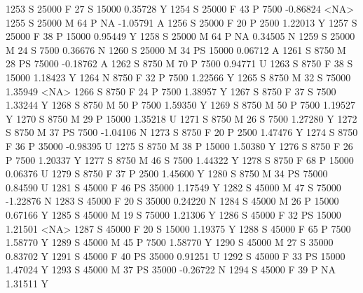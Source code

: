 \documentclass{article}
\begin{document}
\begin{Schunk}
\begin{Soutput}
1253      S      25000   F  27         S  15000   0.35728    Y
1254      S      25000   F  43         P   7500  -0.86824 <NA>
1255      S      25000   M  64         P     NA  -1.05791    A
1256      S      25000   F  20         P   2500   1.22013    Y
1257      S      25000   F  38         P  15000   0.95449    Y
1258      S      25000   M  64         P     NA   0.34505    N
1259      S      25000   M  24         S   7500   0.36676    N
1260      S      25000   M  34        PS  15000   0.06712    A
1261      S       8750   M  28        PS  75000  -0.18762    A
1262      S       8750   M  70         P   7500   0.94771    U
1263      S       8750   F  38         S  15000   1.18423    Y
1264      N       8750   F  32         P   7500   1.22566    Y
1265      S       8750   M  32         S  75000   1.35949 <NA>
1266      S       8750   F  24         P   7500   1.38957    Y
1267      S       8750   F  37         S   7500   1.33244    Y
1268      S       8750   M  50         P   7500   1.59350    Y
1269      S       8750   M  50         P   7500   1.19527    Y
1270      S       8750   M  29         P  15000   1.35218    U
1271      S       8750   M  26         S   7500   1.27280    Y
1272      S       8750   M  37        PS   7500  -1.04106    N
1273      S       8750   F  20         P   2500   1.47476    Y
1274      S       8750   F  36         P  35000  -0.98395    U
1275      S       8750   M  38         P  15000   1.50380    Y
1276      S       8750   F  26         P   7500   1.20337    Y
1277      S       8750   M  46         S   7500   1.44322    Y
1278      S       8750   F  68         P  15000   0.06376    U
1279      S       8750   F  37         P   2500   1.45600    Y
1280      S       8750   M  34        PS  75000   0.84590    U
1281      S      45000   F  46        PS  35000   1.17549    Y
1282      S      45000   M  47         S  75000  -1.22876    N
1283      S      45000   F  20         S  35000   0.24220    N
1284      S      45000   M  26         P  15000   0.67166    Y
1285      S      45000   M  19         S  75000   1.21306    Y
1286      S      45000   F  32        PS  15000   1.21501 <NA>
1287      S      45000   F  20         S  15000   1.19375    Y
1288      S      45000   F  65         P   7500   1.58770    Y
1289      S      45000   M  45         P   7500   1.58770    Y
1290      S      45000   M  27         S  35000   0.83702    Y
1291      S      45000   F  40        PS  35000   0.91251    U
1292      S      45000   F  33        PS  15000   1.47024    Y
1293      S      45000   M  37        PS  35000  -0.26722    N
1294      S      45000   F  39         P     NA   1.31511    Y

\end{Soutput}
\end{Schunk}
\end{document}
